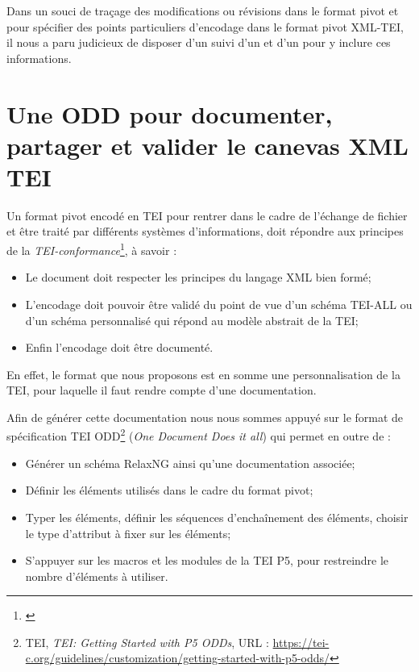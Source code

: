 Dans un souci de traçage des modifications ou révisions dans le format pivot et pour spécifier des points particuliers d'encodage dans le format pivot XML-TEI, il nous a paru judicieux de disposer d'un  suivi d'un 
 et d'un  pour y inclure ces informations.

\section{Une ODD pour documenter, partager et valider le canevas XML TEI}

Un format pivot encodé en TEI pour rentrer dans le cadre de l'échange de fichier et être traité par différents systèmes d'informations, doit répondre aux principes de la \textit{TEI-conformance}\footnote{\cite{camps_structuration_2017}}, à savoir :
\begin{itemize}
    \item Le document doit respecter les principes du langage XML bien formé;
    \item L'encodage doit pouvoir être validé du point de vue d'un schéma TEI-ALL ou d'un schéma personnalisé qui répond au modèle abstrait de la TEI;
    \item Enfin l'encodage doit être documenté.
\end{itemize}

En effet, le format que nous proposons est en somme une personnalisation de la TEI, pour laquelle il faut rendre compte d'une documentation.

Afin de générer cette documentation nous nous sommes appuyé sur le format de spécification TEI ODD\footnote{TEI, \textit{TEI: Getting Started with P5 ODDs}, URL : \url{https://tei-c.org/guidelines/customization/getting-started-with-p5-odds/}} (\textit{One Document Does it all}) qui permet en outre de :
\begin{itemize}
    \item Générer un schéma RelaxNG ainsi qu'une documentation associée;
    \item Définir les éléments utilisés dans le cadre du format pivot;
    \item Typer les éléments, définir les séquences d'enchaînement des éléments, choisir le type d'attribut à fixer sur les éléments;
    \item S'appuyer sur les macros et les modules de la TEI P5, pour restreindre le nombre d'éléments à utiliser.
\end{itemize}

